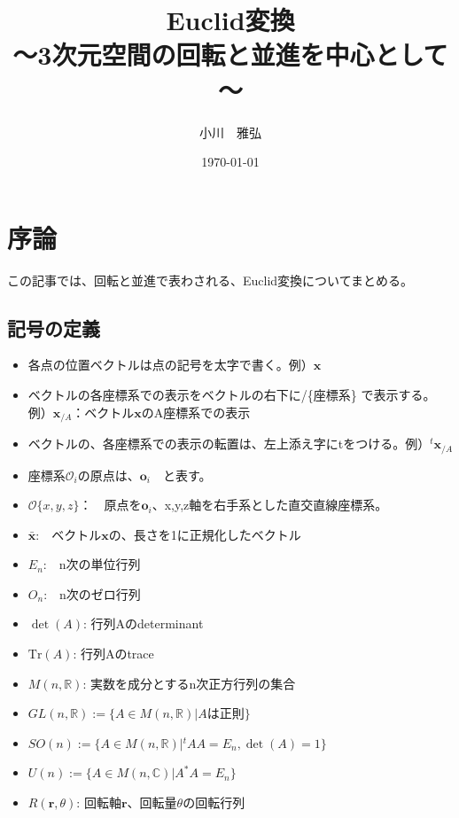\documentclass[10pt]{jarticle}
\begin{document}
\title{Euclid変換\\～3次元空間の回転と並進を中心として～}
\author{小川　雅弘}
\date{\today}
\maketitle

\tableofcontents

\section{序論}
この記事では、回転と並進で表わされる、Euclid変換についてまとめる。

\subsection{記号の定義}
\begin{itemize}
\item 各点の位置ベクトルは点の記号を太字で書く。例）$\boldsymbol{x}$ 
\item ベクトルの各座標系での表示をベクトルの右下に/\{座標系\} で表示する。
例）$\boldsymbol{x}_{/A}$：ベクトル$\boldsymbol{x}$のA座標系での表示 
\item ベクトルの、各座標系での表示の転置は、左上添え字にtをつける。例）$^t\boldsymbol{x}_{/A}$
\item 座標系$\mathcal{O}_i$の原点は、$\boldsymbol{o}_i$　と表す。 
\item $\mathcal{O}\{ x,y,z \} $：　原点を$\boldsymbol{o}_i$、x,y,z軸を右手系とした直交直線座標系。
\item $\bar{\boldsymbol{x}}$:　ベクトル$\boldsymbol{x}$の、長さを1に正規化したベクトル
\item $E_n$:　n次の単位行列
\item $O_n$:　n次のゼロ行列
\item $\det(A)$: 行列Aのdeterminant
\item $\mathrm{Tr}(A)$: 行列Aのtrace
\item $M(n,\mathbb{R})$: 実数を成分とするn次正方行列の集合
\item $GL(n,\mathbb{R}):=\{A \in M(n,\mathbb{R}) | Aは正則\}$
\item $SO(n):=\{A \in M(n,\mathbb{R}) | {}^tAA=E_n, \det(A)=1 \}$
\item $U(n):=\{A \in M(n,\mathbb{C}) | A^*A=E_n\}$
\item $R(\boldsymbol{r},\theta)$: 回転軸$\boldsymbol{r}$、回転量$\theta$の回転行列
\end{itemize}
\end{document}
